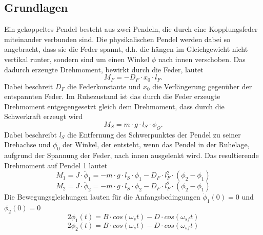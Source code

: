 \documentclass[a4paper, 11pt]{article}
\begin{document}
\subsection{Grundlagen}
Ein gekoppeltes Pendel besteht aus zwei Pendeln, die durch eine Kopplungsfeder miteinander verbunden sind. Die physikalischen Pendel werden dabei so angebracht, dass sie die Feder spannt, d.h. die hängen im Gleichgewicht nicht vertikal runter, sondern sind um einen Winkel $\phi$ nach innen verschoben. Das dadurch erzeugte Drehmoment, bewirkt durch die Feder, lautet
\begin{equation}
M_F = -D_F \cdot x_0 \cdot l_F.
\end{equation}  
Dabei beschreit $D_F$ die Federkonstante und $x_0$ die Verlängerung gegenüber der entspannten Feder. Im Ruhezustand ist das durch die Feder erzeugte Drehmoment entgegengesetzt gleich dem Drehmoment, dass durch die Schwerkraft erzeugt wird
\begin{equation}
M_S = m \cdot g \cdot l_S \cdot \phi_O.
\end{equation}
Dabei beschreibt $l_S$ die Entfernung des Schwerpunktes der Pendel zu seiner Drehachse und $\phi_0$ der Winkel, der entsteht, wenn das Pendel in der Ruhelage, aufgrund der Spannung der Feder, nach innen ausgelenkt wird.
Das resultierende Drehmoment auf Pendel 1 lautet
\begin{equation}
M_1 = J \cdot \ddot \phi_1 = -m \cdot g \cdot l_S \cdot \phi_1 - D_F \cdot l_F^2 \cdot (\phi_2 - \phi_1)
\end{equation}
\begin{equation}
M_2 = J \cdot \ddot \phi_2 = -m \cdot g \cdot l_S \cdot \phi_2 - D_F \cdot l_F^2 \cdot (\phi_2 - \phi_1)
\end{equation} 
Die Bewegungsgleichungen lauten für die Anfangsbedingungen $\dot \phi_1(0) = 0$ und $\dot \phi_2(0) = 0$  
\begin{equation}
2\phi_1(t) = B \cdot cos(\omega_s t) - D \cdot cos(\omega_{sf} t)
\end{equation}
\begin{equation}
2\phi_2(t) = B \cdot cos(\omega_s t) - D \cdot cos(\omega_{sf} t)
\end{equation}

\end{document}
